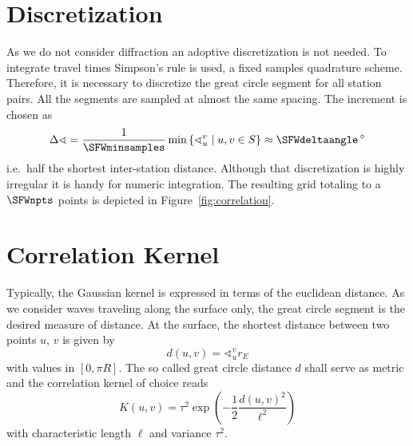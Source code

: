 \documentclass[11pt]{article}
\begin{document}
\section{Discretization}

As we do not consider diffraction an adoptive discretization is not needed.
To integrate travel times Simpson's rule is used, a fixed samples quadrature scheme.
Therefore, it is necessary to discretize the great circle segment for all station pairs.
All the segments are sampled at almost the same spacing.
The increment is chosen as
\begin{equation}
    \Delta\sphericalangle = \frac 1 \SFWminsamples \min\left\{ \sphericalangle_u^v \mid u,v \in S \right\}
    \approx \SFWdeltaangle \,{}^\circ
\end{equation}
i.e.~half the shortest inter-station distance.
Although that discretization is highly irregular it is handy for numeric integration.
The resulting grid totaling to a $\SFWnpts$ points is depicted in Figure~\ref{fig:correlation}.


\section{Correlation Kernel}

Typically, the Gaussian kernel is expressed in terms of the euclidean distance.
As we consider waves traveling along the surface only, the great circle segment is the desired measure of distance.
At the surface, the shortest distance between two points $u$, $v$ is given by
\begin{equation}
    d(u,v) = \sphericalangle_u^v r_E
\end{equation}
with values in $[0, \pi R]$.
The so called great circle distance $d$ shall serve as metric and the correlation kernel of choice reads
\begin{equation}
    K(u,v) = \tau^2 \exp\!\left(-\frac 12 \frac{d(u,v)^2}{\ell^2}\right)
\end{equation}
with characteristic length $\ell$ and variance $\tau^2$.
\end{document}
